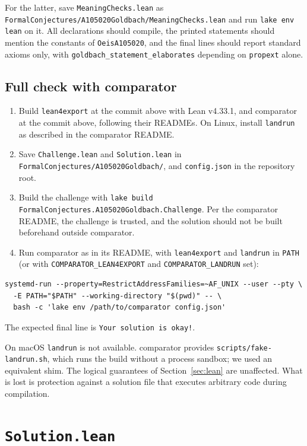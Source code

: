 \documentclass[11pt,a4paper]{article}
\newcommand{\li}{\lstinline[style=inline]}
\theoremstyle{plain}
\theoremstyle{remark}
\begin{document}
{For the latter, save \texttt{MeaningChecks.lean} as
\nolinkurl{FormalConjectures/A105020Goldbach/MeaningChecks.lean} and run
\texttt{lake env lean} on it. All declarations should compile, the printed statements
should mention the constants of \li{OeisA105020}, and the final lines should report
standard axioms only, with \li{goldbach_statement_elaborates} depending on
\li{propext} alone.

\subsection{Full check with comparator}

\begin{enumerate}
\item Build \texttt{lean4export} at the commit above with Lean v4.33.1, and comparator
  at the commit above, following their READMEs. On Linux, install \texttt{landrun} as
  described in the comparator README.
\item Save \texttt{Challenge.lean} and \texttt{Solution.lean} in
  \nolinkurl{FormalConjectures/A105020Goldbach/}, and \texttt{config.json} in the
  repository root.
\item Build the challenge with
  \texttt{lake build} \nolinkurl{FormalConjectures.A105020Goldbach.Challenge}. Per the
  comparator README, the challenge is trusted, and the solution should not be built
  beforehand outside comparator.
\item Run comparator as in its README, with \texttt{lean4export} and \texttt{landrun}
  in \texttt{PATH} (or with \texttt{COMPARATOR\_LEAN4EXPORT} and
  \texttt{COMPARATOR\_LANDRUN} set):
\end{enumerate}
\begin{lstlisting}
systemd-run --property=RestrictAddressFamilies=~AF_UNIX --user --pty \
  -E PATH="$PATH" --working-directory "$(pwd)" -- \
  bash -c 'lake env /path/to/comparator config.json'
\end{lstlisting}
The expected final line is \li{Your solution is okay!}.

On macOS \texttt{landrun} is not available. comparator provides
\texttt{scripts/fake-landrun.sh}, which runs the build without a process sandbox; we
used an equivalent shim. The logical guarantees of Section~\ref{sec:lean} are
unaffected. What is lost is protection against a solution file that executes arbitrary
code during compilation.

\section{\texorpdfstring{\texttt{Solution.lean}}{Solution.lean}}\label{app:solution}


}
\end{document}
